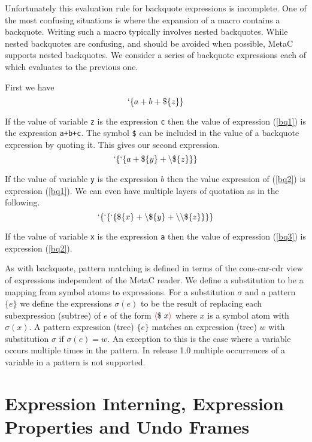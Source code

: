 \documentclass{article}
\newcommand{\fopen}{{\color{red} \langle}}
\newcommand{\fclose}{{\color{red} \rangle}}
\begin{document}
Unfortunately this evaluation rule for backquote expressions is incomplete.  One of the most
confusing situations is where the expansion of a macro contains a backquote.  Writing such a macro typically involves nested backquotes.  While nested backquotes
are confusing, and should be avoided when possible, MetaC supports nested backquotes.  We consider a series of backquote expressions each of which evaluates to the previous one.

First we have
\begin{equation}
\label{bq1}
`\{a+b+\$\{z\}\}
\end{equation}

If the value of variable {\tt z} is the expression {\tt c} then the value of expression (\ref{bq1}) is the expression {\tt a+b+c}.
The symbol {\tt \$} can be included in the value of a backquote expression by quoting it.  This gives our second expression.
\begin{equation}
\label{bq2}
`\{`\{a + \$\{y\} + \backslash\$\{z\}\}\}
\end{equation}

If the value of variable {\tt y} is the expression $b$ then the value expression of (\ref{bq2}) is expression (\ref{bq1}).
We can even have multiple layers of quotation as in the following.
\begin{equation}
\label{bq3}
`\{`\{`\{\$\{x\} + \backslash\$\{y\} + \backslash\backslash\$\{z\}\}\}\}
\end{equation}

If the value of variable {\tt x} is the expression {\tt a} then the value of expression (\ref{bq3}) is expression (\ref{bq2}).

As with backquote, pattern matching is defined in terms of the cons-car-cdr view of expressions independent of the MetaC reader.  We define a substitution to be a mapping from
symbol atoms to expressions. For a substitution $\sigma$ and a pattern $\{e\}$ we define the expressions $\sigma(e)$
to be the result of replacing each subexpression (subtree) of $e$ of the form $\fopen \$\;x \fclose$ where $x$ is a symbol atom with $\sigma(x)$.  A pattern expression (tree) $\{e\}$ matches an expression (tree) $w$ with substitution $\sigma$
if $\sigma(e) = w$. An exception to this is the case where a variable occurs multiple times in the pattern.  In release 1.0 multiple occurrences of a variable in a pattern is not supported.

\section{Expression Interning, Expression Properties and Undo Frames}
\end{document}
